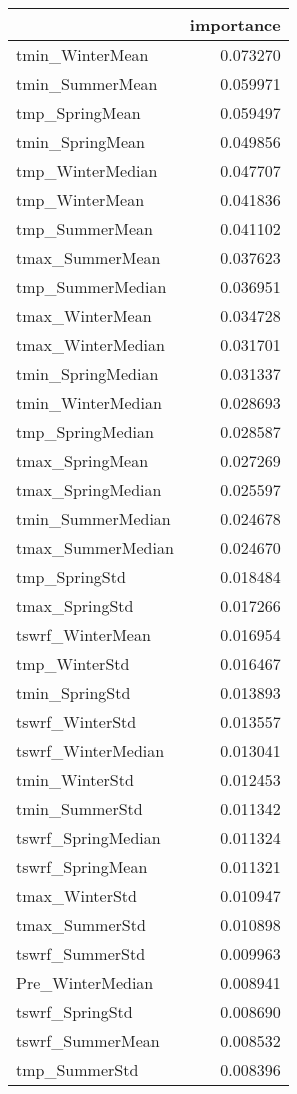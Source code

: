 \begin{tabular}{lr}
\toprule
 & importance \\
\midrule
tmin_WinterMean & 0.073270 \\
tmin_SummerMean & 0.059971 \\
tmp_SpringMean & 0.059497 \\
tmin_SpringMean & 0.049856 \\
tmp_WinterMedian & 0.047707 \\
tmp_WinterMean & 0.041836 \\
tmp_SummerMean & 0.041102 \\
tmax_SummerMean & 0.037623 \\
tmp_SummerMedian & 0.036951 \\
tmax_WinterMean & 0.034728 \\
tmax_WinterMedian & 0.031701 \\
tmin_SpringMedian & 0.031337 \\
tmin_WinterMedian & 0.028693 \\
tmp_SpringMedian & 0.028587 \\
tmax_SpringMean & 0.027269 \\
tmax_SpringMedian & 0.025597 \\
tmin_SummerMedian & 0.024678 \\
tmax_SummerMedian & 0.024670 \\
tmp_SpringStd & 0.018484 \\
tmax_SpringStd & 0.017266 \\
tswrf_WinterMean & 0.016954 \\
tmp_WinterStd & 0.016467 \\
tmin_SpringStd & 0.013893 \\
tswrf_WinterStd & 0.013557 \\
tswrf_WinterMedian & 0.013041 \\
tmin_WinterStd & 0.012453 \\
tmin_SummerStd & 0.011342 \\
tswrf_SpringMedian & 0.011324 \\
tswrf_SpringMean & 0.011321 \\
tmax_WinterStd & 0.010947 \\
tmax_SummerStd & 0.010898 \\
tswrf_SummerStd & 0.009963 \\
Pre_WinterMedian & 0.008941 \\
tswrf_SpringStd & 0.008690 \\
tswrf_SummerMean & 0.008532 \\
tmp_SummerStd & 0.008396 \\

\end{tabular}
